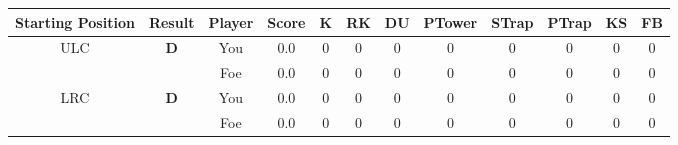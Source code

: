 \documentclass[a4paper,12pt]{article}
\begin{document}
  \begin{tabular}[t]{| c | c | c | c | c | c | c | c | c | c | c | c
      |}
    \hline
    Starting Position & \textbf{Result} & Player & \textbf{Score} & K & RK & DU & PTower & STrap & PTrap & KS & FB \\
    
      
                      
      
                      
      
                      
      
                      
      
                      
      
                      
      
                      
      
                      
      
                      
      
                      
      
        \hline
        \multirow{2}{*}{  ULC  } &
              \multirow{2}{*}{  
                  \textbf{D}  } & 
                    \cellcolor{yellow!25} You & \cellcolor{yellow!25} 0.0 & \cellcolor{yellow!25} 0 &
                    \cellcolor{yellow!25} 0 & \cellcolor{yellow!25} 0 & \cellcolor{yellow!25} 0 &
                    \cellcolor{yellow!25} 0 & \cellcolor{yellow!25} 0 & \cellcolor{yellow!25} 0 &
                    \cellcolor{yellow!25} 0 \\
                    \cline{3-12}
                    & & \cellcolor{red!15} Foe & \cellcolor{red!15} 0.0 & \cellcolor{red!15} 0 & \cellcolor{red!15}
                    0 & \cellcolor{red!15} 0
                    & \cellcolor{red!15} 0 & \cellcolor{red!15}
                    0 & \cellcolor{red!15} 0 
                    & \cellcolor{red!15} 0 & \cellcolor{red!15}
                    0 \\
                    
                      
      
                      
      
        \hline
        \multirow{2}{*}{  LRC
             } &
              \multirow{2}{*}{  
                  \textbf{D}  } & 
                    \cellcolor{yellow!25} You & \cellcolor{yellow!25} 0.0 & \cellcolor{yellow!25} 0 &
                    \cellcolor{yellow!25} 0 & \cellcolor{yellow!25} 0 & \cellcolor{yellow!25} 0 &
                    \cellcolor{yellow!25} 0 & \cellcolor{yellow!25} 0 & \cellcolor{yellow!25} 0 &
                    \cellcolor{yellow!25} 0 \\
                    \cline{3-12}
                    & & \cellcolor{red!15} Foe & \cellcolor{red!15} 0.0 & \cellcolor{red!15} 0 & \cellcolor{red!15}
                    0 & \cellcolor{red!15} 0
                    & \cellcolor{red!15} 0 & \cellcolor{red!15}
                    0 & \cellcolor{red!15} 0 
                    & \cellcolor{red!15} 0 & \cellcolor{red!15}
                    0 \\
                    

\end{tabular}
\end{document}
